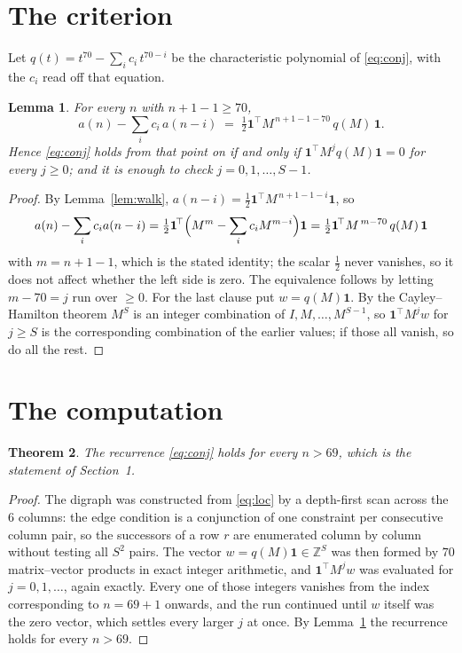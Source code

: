 \documentclass[11pt,a4paper]{article}
\theoremstyle{plain}
\newtheorem{theorem}{Theorem}
\newtheorem{lemma}[theorem]{Lemma}
\theoremstyle{definition}
\begin{document}
\section{The criterion}

Let $q(t)=t^{70}-\sum_i c_i\,t^{70-i}$ be the characteristic polynomial of
\eqref{eq:conj}, with the $c_i$ read off that equation.

\begin{lemma}\label{lem:crit}
For every $n$ with $n+1-1\ge70$,
\[
a(n)-\sum_i c_i\,a(n-i)\;=\;\tfrac1{2}\mathbf{1}^{\!\top}M^{\,n+1-1-70}\,q(M)\,\mathbf{1} .
\]
Hence \eqref{eq:conj} holds from that point on if and only if
$\mathbf{1}^{\!\top}M^{j}q(M)\mathbf{1}=0$ for every $j\ge0$; and it is enough to check
$j=0,1,\dots,S-1$.
\end{lemma}

\begin{proof}
By Lemma~\ref{lem:walk}, $a(n-i)=\tfrac1{2}\mathbf{1}^{\!\top}M^{\,n+1-1-i}\mathbf{1}$, so
\[
a(n)-\sum_i c_i a(n-i)
=\tfrac1{2}\mathbf{1}^{\!\top}\Bigl(M^{m}-\sum_i c_i M^{m-i}\Bigr)\mathbf{1}
=\tfrac1{2}\mathbf{1}^{\!\top}M^{\,m-70}\,q(M)\,\mathbf{1}
\]
with $m=n+1-1$, which is the stated identity; the scalar $\tfrac1{2}$ never vanishes, so
it does not affect whether the left side is zero. The equivalence follows by letting
$m-70=j$ run over $\ge0$. For the last clause put $w=q(M)\mathbf{1}$. By the
Cayley--Hamilton theorem $M^{S}$ is an integer combination of $I,M,\dots,M^{S-1}$, so
$\mathbf{1}^{\!\top}M^{j}w$ for $j\ge S$ is the corresponding combination of the earlier
values; if those all vanish, so do all the rest.
\end{proof}

\section{The computation}

\begin{theorem}
The recurrence \eqref{eq:conj} holds for every $n>69$, which is the statement of
Section~1.
\end{theorem}

\begin{proof}
The digraph was constructed from \eqref{eq:loc} by a depth-first scan across the $6$
columns: the edge condition is a conjunction of one constraint per consecutive column
pair, so the successors of a row $r$ are enumerated column by column without testing all
$S^2$ pairs. The vector $w=q(M)\mathbf{1}\in\mathbb{Z}^{S}$ was then formed by $70$
matrix--vector products in exact integer arithmetic, and $\mathbf{1}^{\!\top}M^{j}w$ was
evaluated for $j=0,1,\dots$, again exactly. Every one of those integers vanishes from the
index corresponding to $n=69+1$ onwards, and the run continued until $w$ itself was the
zero vector, which settles every larger $j$ at once. By Lemma~\ref{lem:crit} the recurrence
holds for every $n>69$.
\end{proof}
\end{document}
